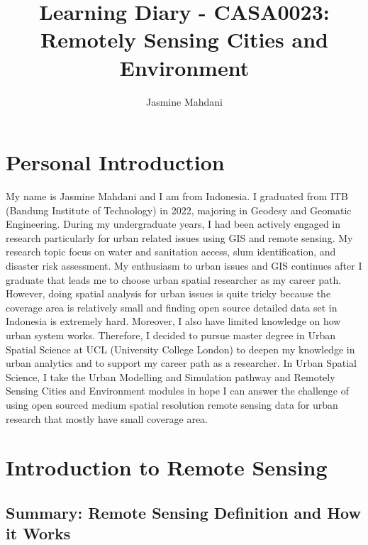 \documentclass[
  letterpaper,
  DIV=11,
  numbers=noendperiod]{scrreprt}
\title{Learning Diary - CASA0023: Remotely Sensing Cities and
Environment}
\author{Jasmine Mahdani}
\date{}
\renewcommand*\contentsname{Table of contents}
\newcommand\contentsname{Table of contents}
\begin{document}
\maketitle

\renewcommand*\contentsname{Table of contents}
{
\hypersetup{linkcolor=}
\setcounter{tocdepth}{2}
\tableofcontents
}


\chapter*{Personal Introduction}\label{personal-introduction}


My name is Jasmine Mahdani and I am from Indonesia. I graduated from ITB
(Bandung Institute of Technology) in 2022, majoring in Geodesy and
Geomatic Engineering. During my undergraduate years, I had been actively
engaged in research particularly for urban related issues using GIS and
remote sensing. My research topic focus on water and sanitation access,
slum identification, and disaster risk assessment. My enthusiasm to
urban issues and GIS continues after I graduate that leads me to choose
urban spatial researcher as my career path. However, doing spatial
analysis for urban issues is quite tricky because the coverage area is
relatively small and finding open source detailed data set in Indonesia
is extremely hard. Moreover, I also have limited knowledge on how urban
system works. Therefore, I decided to pursue master degree in Urban
Spatial Science at UCL (University College London) to deepen my
knowledge in urban analytics and to support my career path as a
researcher. In Urban Spatial Science, I take the Urban Modelling and
Simulation pathway and Remotely Sensing Cities and Environment modules
in hope I can answer the challenge of using open sourced medium spatial
resolution remote sensing data for urban research that mostly have small
coverage area.


\chapter{Introduction to Remote
Sensing}\label{introduction-to-remote-sensing}

\section{Summary: Remote Sensing Definition and How it
Works}\label{summary-remote-sensing-definition-and-how-it-works}
\end{document}
